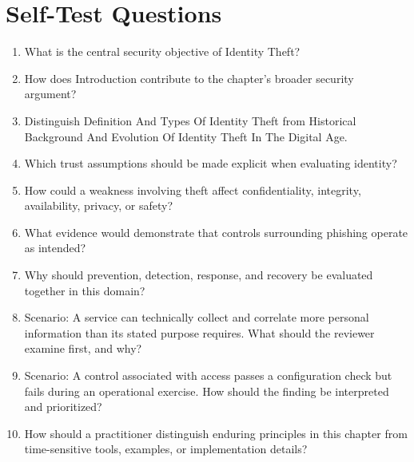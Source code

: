 \documentclass[11pt]{article}
\begin{document}
\section*{Self-Test Questions}
\begin{enumerate}
\item What is the central security objective of Identity Theft?
\item How does Introduction contribute to the chapter's broader security argument?
\item Distinguish Definition And Types Of Identity Theft from Historical Background And Evolution Of Identity Theft In The Digital Age.
\item Which trust assumptions should be made explicit when evaluating identity?
\item How could a weakness involving theft affect confidentiality, integrity, availability, privacy, or safety?
\item What evidence would demonstrate that controls surrounding phishing operate as intended?
\item Why should prevention, detection, response, and recovery be evaluated together in this domain?
\item Scenario: A service can technically collect and correlate more personal information than its stated purpose requires. What should the reviewer examine first, and why?
\item Scenario: A control associated with access passes a configuration check but fails during an operational exercise. How should the finding be interpreted and prioritized?
\item How should a practitioner distinguish enduring principles in this chapter from time-sensitive tools, examples, or implementation details?
\end{enumerate}
\end{document}
